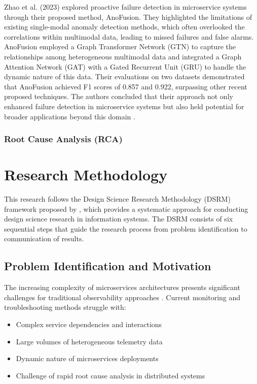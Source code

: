 \documentclass[10pt,journal,compsoc]{IEEEtran}
\begin{document}
Zhao et al. (2023) explored proactive failure detection in microservice systems through their proposed method, AnoFusion. They highlighted the limitations of existing single-modal anomaly detection methods, which often overlooked the correlations within multimodal data, leading to missed failures and false alarms. AnoFusion employed a Graph Transformer Network (GTN) to capture the relationships among heterogeneous multimodal data and integrated a Graph Attention Network (GAT) with a Gated Recurrent Unit (GRU) to handle the dynamic nature of this data. Their evaluations on two datasets demonstrated that AnoFusion achieved F1 scores of 0.857 and 0.922, surpassing other recent proposed techniques. The authors concluded that their approach not only enhanced failure detection in microservice systems but also held potential for broader applications beyond this domain \cite{zhao2023robust}.


\subsubsection{Root Cause Analysis (RCA)}




\section{Research Methodology}

This research follows the Design Science Research Methodology (DSRM) framework proposed by \cite{peffers2007design}, which provides a systematic approach for conducting design science research in information systems. The DSRM consists of six sequential steps that guide the research process from problem identification to communication of results.

\subsection{Problem Identification and Motivation}

The increasing complexity of microservices architectures presents significant challenges for traditional observability approaches \cite{berndt2002catch}. Current monitoring and troubleshooting methods struggle with:

\begin{itemize}
    \item Complex service dependencies and interactions
    \item Large volumes of heterogeneous telemetry data
    \item Dynamic nature of microservices deployments
    \item Challenge of rapid root cause analysis in distributed systems
\end{itemize}
\end{document}
